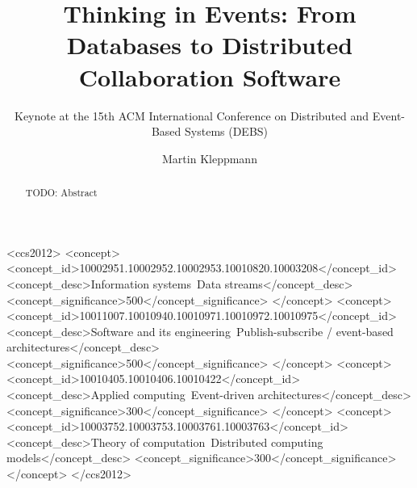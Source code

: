 \documentclass[sigconf,nonacm]{acmart}
\begin{document}
\title{Thinking in Events: From Databases to Distributed Collaboration Software}
\subtitle{Keynote at the 15th ACM International Conference on Distributed and Event-Based Systems (DEBS)}

\author{Martin Kleppmann}

\begin{abstract}
TODO: Abstract
\end{abstract}

\begin{CCSXML}
<ccs2012>
  <concept>
    <concept_id>10002951.10002952.10002953.10010820.10003208</concept_id>
    <concept_desc>Information systems~Data streams</concept_desc>
    <concept_significance>500</concept_significance>
  </concept>
  <concept>
    <concept_id>10011007.10010940.10010971.10010972.10010975</concept_id>
    <concept_desc>Software and its engineering~Publish-subscribe / event-based architectures</concept_desc>
    <concept_significance>500</concept_significance>
  </concept>
  <concept>
    <concept_id>10010405.10010406.10010422</concept_id>
    <concept_desc>Applied computing~Event-driven architectures</concept_desc>
    <concept_significance>300</concept_significance>
  </concept>
  <concept>
    <concept_id>10003752.10003753.10003761.10003763</concept_id>
    <concept_desc>Theory of computation~Distributed computing models</concept_desc>
    <concept_significance>300</concept_significance>
  </concept>
</ccs2012>
\end{CCSXML}


\maketitle

\def\figureautorefname{Figure}
\def\sectionautorefname{Section}
\def\subsectionautorefname{Section}
\def\subsubsectionautorefname{Section}


\end{document}
